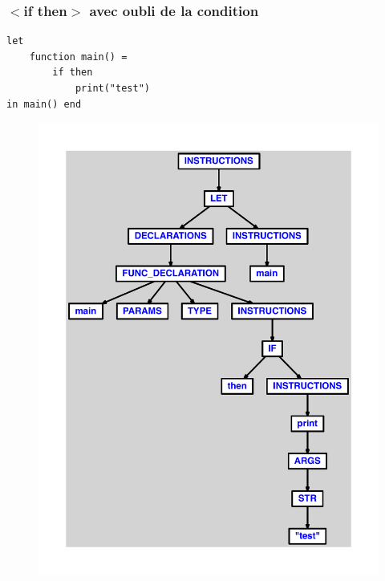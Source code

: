 \documentclass{article}
\begin{document}
\subsubsection{$ < $if then$ > $ avec oubli de la condition}
\begin{lstlisting}
let
	function main() =
		if then
			print("test")
in main() end
\end{lstlisting}
\newpage
\begin{figure}[H]
\centering
\includegraphics[max width=\textwidth]{ast/ast_253.pdf}
\end{figure}
\newpage
\end{document}

